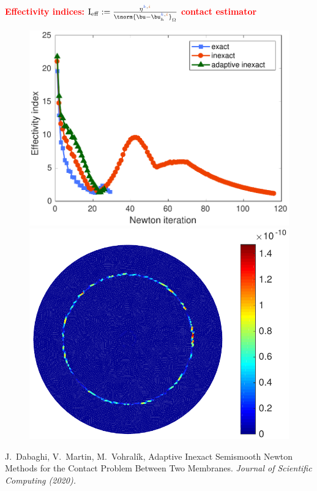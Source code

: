 \begin{frame}
  \vspace*{0.1 cm}
  \hspace{0.5 cm}\textcolor{red}{\textbf{Effectivity indices:}} $\mathrm{I}_{\mathrm{eff}} \egaldef \frac{\eta^{\kk,\ii}}{\tnorm{\bu-\bu_h^{\kk,\ii}}_{\Omega}}$ \hspace{3 cm} \textcolor{red}{\textbf{contact estimator}}
\vspace*{-0.2 cm}
  \begin{figure}
\includegraphics[width=0.46 \textwidth]{p2/P2_effectivity_index_three_methods}    
\quad 
\includegraphics[width=0.49 \textwidth]{fig_article_chap_1/modif_fig_contact_estimator_hmax0,09_Dt0,001_tt180}
\end{figure}
\begin{thebibliography}{10}
 \scriptsize{
 {\sc J.~Dabaghi, V.~Martin, M.~Vohral\'{i}k}, Adaptive Inexact Semismooth Newton Methods for the
Contact Problem Between Two Membranes.
\em{Journal of Scientific Computing} (2020).
}
 \end{thebibliography}
\end{frame}